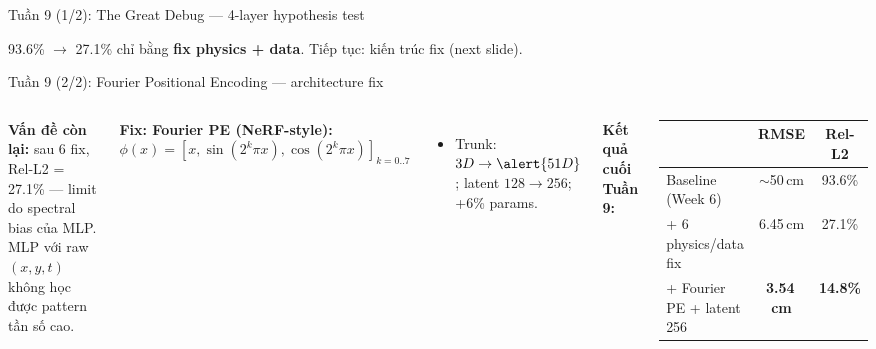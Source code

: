 \documentclass[11pt,aspectratio=169]{beamer}
\begin{document}
\begin{frame}{Tuần 9 (1/2): The Great Debug --- 4-layer hypothesis test}
  \vspace{4pt}
  \begin{block}{}
    93.6\% $\to$ 27.1\% chỉ bằng \textbf{fix physics + data}. Tiếp tục: kiến trúc fix (next slide).
  \end{block}
\end{frame}

\begin{frame}{Tuần 9 (2/2): Fourier Positional Encoding --- architecture fix}
  \small
  \begin{columns}[T]
      \textbf{Vấn đề còn lại:} sau 6 fix, Rel-L2 = 27.1\% --- limit do \alert{spectral bias} của MLP.
      MLP với raw $(x, y, t)$ không học được pattern tần số cao.

      \vspace{4pt}
      \textbf{Fix: Fourier PE (NeRF-style):}
      $\phi(x) = [x, \sin(2^k\pi x), \cos(2^k\pi x)]_{k=0..7}$
      \begin{itemize}\itemsep0pt
        \item Trunk: $3D \to \alert{51D}$; latent $128 \to 256$; +6\% params.
      \end{itemize}

      \vspace{4pt}
      \textbf{Kết quả cuối Tuần 9:}
      \begin{center}
        \scriptsize
        \begin{tabular}{l c c}
          \toprule
          & RMSE & Rel-L2 \\
          \midrule
          Baseline (Week 6) & $\sim$50\,cm & \alert{93.6\%} \\
          + 6 physics/data fix & 6.45\,cm & 27.1\% \\
          + Fourier PE + latent 256 & \alert{\textbf{3.54\,cm}} & \alert{\textbf{14.8\%}} \\
          \bottomrule
        \end{tabular}
      \end{center}


\end{columns}
\end{frame}
\end{document}
